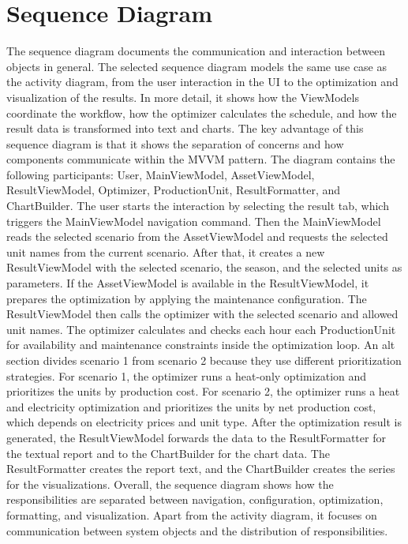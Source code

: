 \section{Sequence Diagram}


The sequence diagram documents the communication and interaction between objects in general. The selected sequence diagram models the same use case as the activity diagram, from the user interaction in the UI to the optimization and visualization of the results. In more detail, it shows how the ViewModels coordinate the workflow, how the optimizer calculates the schedule, and how the result data is transformed into text and charts. The key advantage of this sequence diagram is that it shows the separation of concerns and how components communicate within the MVVM pattern. 
The diagram contains the following participants: User, MainViewModel, AssetViewModel, ResultViewModel, Optimizer, ProductionUnit, ResultFormatter, and ChartBuilder. 
The user starts the interaction by selecting the result tab, which triggers the MainViewModel navigation command. Then the MainViewModel reads the selected scenario from the AssetViewModel and requests the selected unit names from the current scenario. After that, it creates a new ResultViewModel with the selected scenario, the season, and the selected units as parameters. 
If the AssetViewModel is available in the ResultViewModel, it prepares the optimization by applying the maintenance configuration. The ResultViewModel then calls the optimizer with the selected scenario and allowed unit names. The optimizer calculates and checks each hour each ProductionUnit for availability and maintenance constraints inside the optimization loop. 
An alt section divides scenario 1 from scenario 2 because they use different prioritization strategies. For scenario 1, the optimizer runs a heat-only optimization and prioritizes the units by production cost. For scenario 2, the optimizer runs a heat and electricity optimization and prioritizes the units by net production cost, which depends on electricity prices and unit type. 
After the optimization result is generated, the ResultViewModel forwards the data to the ResultFormatter for the textual report and to the ChartBuilder for the chart data. The ResultFormatter creates the report text, and the ChartBuilder creates the series for the visualizations. 
Overall, the sequence diagram shows how the responsibilities are separated between navigation, configuration, optimization, formatting, and visualization. Apart from the activity diagram, it focuses on communication between system objects and the distribution of responsibilities. 

